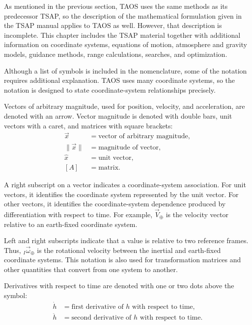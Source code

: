 As mentioned in the previous section, TAOS uses the same methods as its predecessor
TSAP, so the description of the mathematical formulation given in the
TSAP manual applies to TAOS as well. However, that description is incomplete. This
chapter includes the TSAP material together with additional information on coordinate
systems, equations of motion, atmosphere and gravity models, guidance methods,
range calculations, searches, and optimization.


Although a list of symbols is included in the nomenclature, some of the notation
requires additional explanation. TAOS uses many coordinate systems, so the notation
is designed to state coordinate-system relationships precisely.

Vectors of arbitrary magnitude, used for position, velocity, and acceleration, are
denoted with an arrow. Vector magnitude is denoted with double bars, unit vectors
with a caret, and matrices with square brackets:
\[
\begin{aligned}
  \vec{x}       &={} \text{vector of arbitrary magnitude},\\
  \lVert\vec{x}\rVert &={} \text{magnitude of vector},\\
  \hat{x}       &={} \text{unit vector},\\
  [A]           &={} \text{matrix}.
\end{aligned}
\]

A right subscript on a vector indicates a coordinate-system association. For unit
vectors, it identifies the coordinate system represented by the unit vector. For other
vectors, it identifies the coordinate-system dependence produced by differentiation
with respect to time. For example, $\vec{V}_{\oplus}$ is the velocity vector relative
to an earth-fixed coordinate system.

Left and right subscripts indicate that a value is relative to two reference frames.
Thus, ${}_{I}\vec{\omega}_{\oplus}$ is the rotational velocity between the inertial
and earth-fixed coordinate systems. This notation is also used for transformation
matrices and other quantities that convert from one system to another.

Derivatives with respect to time are denoted with one or two dots above the symbol:
\[
\begin{aligned}
  \dot{h}  &={} \text{first derivative of $h$ with respect to time},\\
  \ddot{h} &={} \text{second derivative of $h$ with respect to time}.
\end{aligned}
\]

